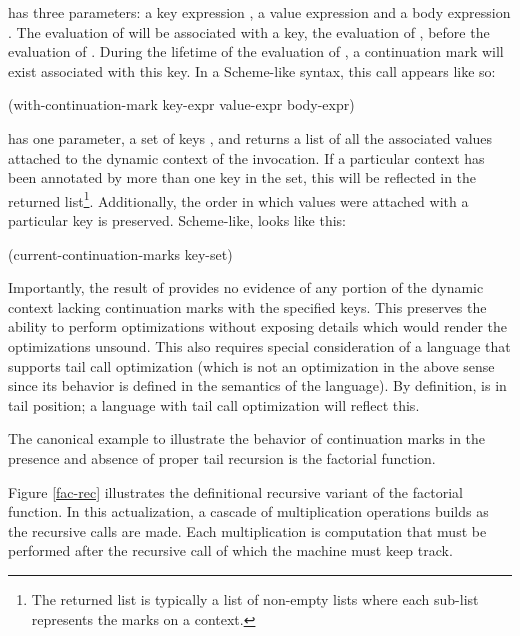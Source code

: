 \documentclass[ms,electronic,twosidetoc,letterpaper,chaptercenter,parttop]{byumsphd}
\begin{document}
 has three parameters: a key expression , a 
value expression  and a body expression . The evaluation 
of  will be associated with a key, the evaluation of , 
before the evaluation of . During the lifetime of the evaluation of 
, a continuation mark will exist associated with this key. In a Scheme-like 
syntax, this call appears like so:

\begin{schemedisplay}
(with-continuation-mark key-expr value-expr body-expr)
\end{schemedisplay}

 has one parameter, a set of keys , and returns a list of
all the associated values attached to the dynamic context of the invocation. If a particular 
context has been annotated by more than one key in the set, this will be reflected in the 
returned list\footnote{The returned list is typically a list of non-empty lists where each 
sub-list represents the marks on a context.}. Additionally, the order in which values were 
attached with a particular key is preserved. Scheme-like, 
looks like this:

\begin{schemedisplay}
(current-continuation-marks key-set)
\end{schemedisplay}

Importantly, the result of  provides no evidence of any portion of the
dynamic context lacking continuation marks with the specified keys. This preserves the
ability to perform optimizations without exposing details which would render the
optimizations unsound. This also requires special consideration of a language that
supports tail call optimization (which is not an optimization in the above sense since its
behavior is defined in the semantics of the language). By definition,  is 
in tail position; a language with tail call optimization will reflect this.

The canonical example to illustrate the behavior of continuation marks in the presence and
absence of proper tail recursion is the factorial function.

Figure \ref{fac-rec} illustrates the definitional recursive variant of the factorial
function. In this actualization, a cascade of multiplication operations builds as the
recursive calls are made. Each multiplication is computation that must be performed after
the recursive call of which the machine must keep track.
\end{document}
